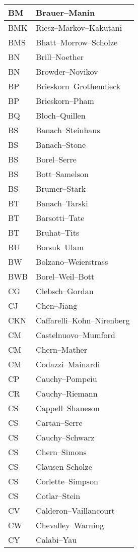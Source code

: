 \documentclass{amsart}
\numberwithin{equation}{section}
\theoremstyle{plain}
\numberwithin{equation}{section}
\theoremstyle{remark}
\begin{document}
\begin{multicols}{2}
{\begin{longtable}{l|l}
BM & Brauer--Manin\\ \hline
BMK & Riesz--Markov--Kakutani\\ \hline
BMS & Bhatt--Morrow--Scholze\\ \hline
BN & Brill--Noether\\ \hline
BN & Browder--Novikov\\ \hline
BP & Brieskorn--Grothendieck\\ \hline
BP & Brieskorn--Pham\\ \hline
BQ & Bloch--Quillen\\ \hline
BS & Banach--Steinhaus\\ \hline
BS & Banach--Stone\\ \hline
BS & Borel--Serre\\ \hline
BS & Bott--Samelson\\ \hline
BS & Brumer--Stark\\ \hline
BT & Banach--Tarski\\ \hline
BT & Barsotti--Tate\\ \hline
BT & Bruhat--Tits\\ \hline
BU & Borsuk--Ulam\\ \hline
BW & Bolzano--Weierstrass\\ \hline
BWB & Borel--Weil--Bott\\ \hline
CG & Clebsch--Gordan\\ \hline
CJ & Chen--Jiang\\ \hline
CKN & Caffarelli--Kohn--Nirenberg\\ \hline
CM & Castelnuovo--Mumford\\ \hline
CM & Chern--Mather\\ \hline
CM & Codazzi--Mainardi\\ \hline
CP &  Cauchy--Pompeiu\\ \hline
CR & Cauchy--Riemann\\ \hline
CS & Cappell--Shaneson\\ \hline
CS & Cartan--Serre\\ \hline
CS & Cauchy--Schwarz\\ \hline
CS & Chern--Simons\\ \hline
CS & Clausen-Scholze\\ \hline
CS & Corlette--Simpson\\ \hline
CS & Cotlar--Stein\\ \hline
CV & Calderon--Vaillancourt\\ \hline
CW & Chevalley--Warning\\ \hline
CY & Calabi--Yau\\ \hline

\end{longtable}}
\end{multicols}
\end{document}
